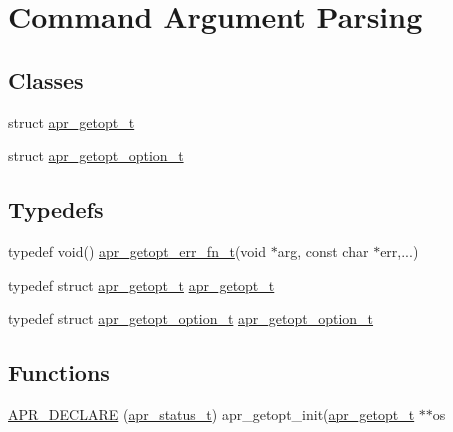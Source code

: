 \hypertarget{group__apr__getopt}{}\section{Command Argument Parsing}
\label{group__apr__getopt}
\subsection*{Classes}
\begin{DoxyCompactItemize}
\item 
struct \mbox{\hyperlink{structapr__getopt__t}{apr\+\_\+getopt\+\_\+t}}
\item 
struct \mbox{\hyperlink{structapr__getopt__option__t}{apr\+\_\+getopt\+\_\+option\+\_\+t}}
\end{DoxyCompactItemize}
\subsection*{Typedefs}
\begin{DoxyCompactItemize}
\item 
typedef void() \mbox{\hyperlink{group__apr__getopt_gad0f6c9baec81bc84293e0f1e2262656e}{apr\+\_\+getopt\+\_\+err\+\_\+fn\+\_\+t}}(void $\ast$arg, const char $\ast$err,...)
\item 
typedef struct \mbox{\hyperlink{structapr__getopt__t}{apr\+\_\+getopt\+\_\+t}} \mbox{\hyperlink{group__apr__getopt_gaed49565eab64803e93f76d0c40d6873d}{apr\+\_\+getopt\+\_\+t}}
\item 
typedef struct \mbox{\hyperlink{structapr__getopt__option__t}{apr\+\_\+getopt\+\_\+option\+\_\+t}} \mbox{\hyperlink{group__apr__getopt_ga114d2af52f3573eaeee2ffa73b2c4ff5}{apr\+\_\+getopt\+\_\+option\+\_\+t}}
\end{DoxyCompactItemize}
\subsection*{Functions}
\begin{DoxyCompactItemize}
\item 
\mbox{\hyperlink{group__apr__getopt_ga29849181eb220ccc0407026401c6639a}{A\+P\+R\+\_\+\+D\+E\+C\+L\+A\+RE}} (\mbox{\hyperlink{group__apr__errno_gaf76ee4543247e9fb3f3546203e590a6c}{apr\+\_\+status\+\_\+t}}) apr\+\_\+getopt\+\_\+init(\mbox{\hyperlink{structapr__getopt__t}{apr\+\_\+getopt\+\_\+t}} $\ast$$\ast$os
\end{DoxyCompactItemize}
